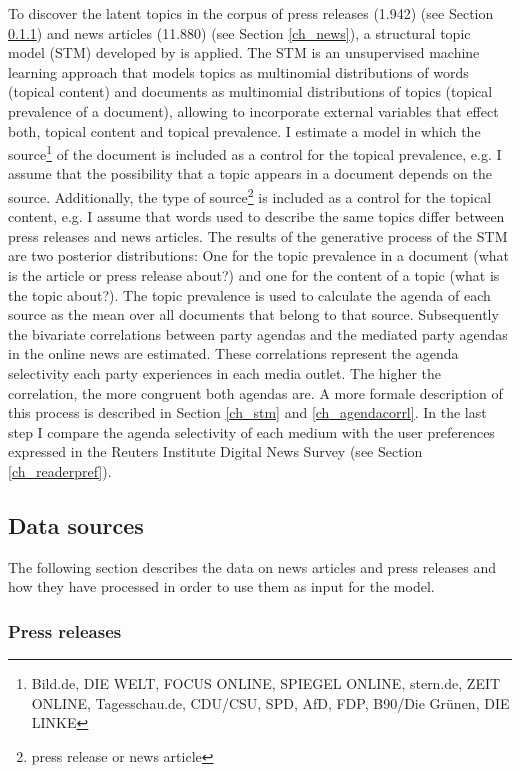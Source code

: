 \documentclass[12pt,a4paper,notitlepage]{article}
\begin{document}
To discover the latent topics in the corpus of press releases (1.942) (see Section \ref{ch_press}) and news articles (11.880) (see Section \ref{ch_news}), a structural topic model (STM) developed by \citet{roberts_model_2016} is applied. The STM is an unsupervised machine learning approach that models topics as multinomial distributions of words (topical content) and documents as multinomial distributions of topics (topical prevalence of a document), allowing to incorporate external variables that effect both, topical content and topical prevalence. I estimate a model in which the source\footnote{Bild.de, DIE WELT, FOCUS ONLINE, SPIEGEL ONLINE, stern.de, ZEIT ONLINE, Tagesschau.de, CDU/CSU, SPD, AfD, FDP, B90/Die Grünen, DIE LINKE} of the document is included as a control for the topical prevalence, e.g. I assume that the possibility that a topic appears in a document depends on the source. Additionally, the type of source\footnote{press release or news article} is included as a control for the topical content, e.g. I assume that words used to describe the same topics differ between press releases and news articles. The results of the generative process of the STM are two posterior distributions: One for the topic prevalence in a document (what is the article or press release about?) and one for the content of a topic (what is the topic about?). The topic prevalence is used to calculate the agenda of each source as the mean over all documents that belong to that source. Subsequently the bivariate correlations between party agendas and the mediated party agendas in the online news are estimated. These correlations represent the agenda selectivity each party experiences in each media outlet. The higher the correlation, the more congruent both agendas are.  A more formale description of this process is described in Section \ref{ch_stm} and \ref{ch_agendacorrl}. In the last step I compare the agenda selectivity of each medium with the user preferences expressed in the Reuters Institute Digital News Survey (see Section \ref{ch_readerpref}). 

\subsection{Data sources}\label{ch_data}

The following section describes the data on news articles and press releases and how they have processed in order to use them as input for the model.

\subsubsection{Press releases}\label{ch_press}
\end{document}
